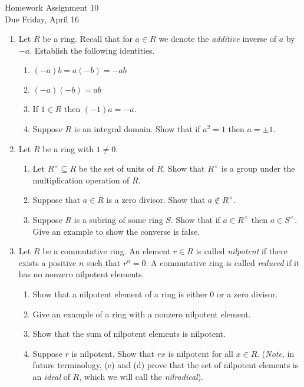 \documentclass[11pt]{article}
\begin{document}
\begin{center}
  \Large {Homework Assignment 10}\\
  \small {Due Friday, April 16}
\end{center}
\begin{enumerate}
  \item{
  Let $R$ be a ring.  Recall that for $a\in R$ we denote the \textit{additive} inverse of $a$ by $-a$.  Establish the following identities.
  \begin{enumerate}
    \item{$(-a)b = a(-b) = -ab$}
    \item{$(-a)(-b) = ab$}
    \item{If $1\in R$ then $(-1)a = -a$.}
    \item{Suppose $R$ is an integral domain.  Show that if $a^2=1$ then $a=\pm1$.}
  \end{enumerate}
  }
  \item{
  Let $R$ be a ring with $1\not=0$.
  \begin{enumerate}
    \item{
    Let $R^\times\subseteq R$ be the set of units of $R$.  Show that $R^\times$ is a group under the multiplication operation of $R$.
    }
    \item{
    Suppose that $a\in R$ is a zero divisor.  Show that $a\notin R^\times$.
    }
    \item{
    Suppose $R$ is a subring of some ring $S$.  Show that if $a\in R^\times$ then $a\in S^\times$.  Give an example to show the converse is false.
    }
  \end{enumerate}
  }
  \item{
  Let $R$ be a commutative ring.  An element $r\in R$ is called \textit{nilpotent} if there exists a positive $n$ such that $r^n=0$.  A commutative ring is called \textit{reduced} if it has no nonzero nilpotent elements.
  \begin{enumerate}
    \item{
    Show that a nilpotent element of a ring is either 0 or a zero divisor.
    }
    \item{
    Give an example of a ring with a nonzero nilpotent element.
    }
    \item{
    Show that the sum of nilpotent elements is nilpotent.
    }
    \item{
    Suppose $r$ is nilpotent.  Show that $rx$ is nilpotent for all $x\in R$.  (\textit{Note}, in future terminology, (c) and (d) prove that the set of nilpotent elements is an \textit{ideal} of $R$, which we will call the \textit{nilradical}).
}
\end{enumerate}}
\end{enumerate}
\end{document}
